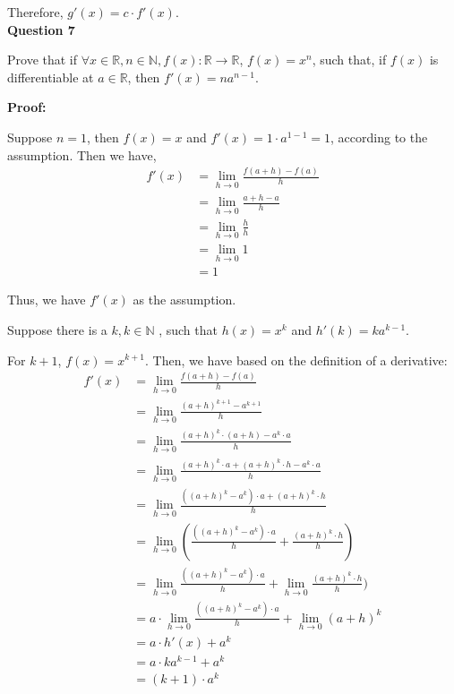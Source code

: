 \documentclass[a4paper,12pt]{report}
\begin{document}
\noindent
Therefore, $g'(x) = c\cdot{f'(x)}$.\\

\noindent
\textbf{Question 7}

\noindent
Prove that if $\forall x\in \mathbb{R}, n\in \mathbb{N}, f(x):\mathbb{R}\rightarrow \mathbb{R}$, $f(x)=x^n$, such that, if $f(x)$ is differentiable at $a\in \mathbb{R}$, then $f'(x)=na^{n-1}$.

\noindent
\textbf{Proof: }

\noindent
Suppose $n = 1$, then $f(x) = x$ and $f'(x) = 1\cdot{a^{1-1}} = 1$, according to the assumption. Then we have,
\begin{align*}
f'(x) &= \displaystyle{\lim_{h\to 0}}\frac{f(a+h)-f(a)}{h}\\
&=\displaystyle{\lim_{h\to 0}}\frac{a+h-a}{h}\\
&=\displaystyle{\lim_{h\to 0}}\frac{h}{h}\\
&=\displaystyle{\lim_{h\to 0}}1\\
&= 1
\end{align*}

\noindent
Thus, we have $f'(x)$ as the assumption. 

\noindent
Suppose there is a $k, k\in \mathbb{N}$ , such that $h(x)=x^k$ and $h'(k)=ka^{k-1}$.

\noindent
For $k+1$, $f(x)=x^{k+1}$. Then, we have based on the definition of a derivative: 
\pagebreak
\begin{align*}
f'(x)&=\displaystyle{\lim_{h\to 0}}\frac{f(a+h)-f(a)}{h}\\
&=\displaystyle{\lim_{h\to 0}}\frac{(a+h)^{k+1}-a^{k+1}}{h}\\
&=\displaystyle{\lim_{h\to 0}}\frac{(a+h)^{k}\cdot{(a+h)}-a^{k}\cdot{a}}{h}\\
&=\displaystyle{\lim_{h\to 0}}\frac{(a+h)^{k}\cdot{a}+(a+h)^{k}\cdot{h}-a^{k}\cdot{a}}{h}\\
&=\displaystyle{\lim_{h\to 0}}\frac{((a+h)^{k}-a^{k})\cdot{a}+(a+h)^{k}\cdot{h}}{h}\\
&=\displaystyle{\lim_{h\to 0}}(\frac{((a+h)^{k}-a^{k})\cdot{a}}{h}+\frac{(a+h)^{k}\cdot{h}}{h})\\
&=\displaystyle{\lim_{h\to 0}}\frac{((a+h)^{k}-a^{k})\cdot{a}}{h}+\displaystyle{\lim_{h\to 0}}\frac{(a+h)^{k}\cdot{h}}{h})\\
&=a\cdot{\displaystyle{\lim_{h\to 0}}\frac{((a+h)^{k}-a^{k})\cdot{a}}{h}}+\displaystyle{\lim_{h\to 0}}(a+h)^{k}\\
&=a\cdot{h'(x)}+a^k\\
&=a\cdot{ka^{k-1}} + a^k\\
&=(k+1)\cdot{a^k}
\end{align*}
\end{document}
